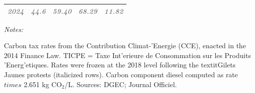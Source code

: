 \begin{table}[!h]
\begin{threeparttable}
\begin{tabular}[t]{lcccc}
\textcolor{gray}{\em{2024}} & \textcolor{gray}{\em{44.6}} & \textcolor{gray}{\em{59.40}} & \textcolor{gray}{\em{68.29}} & \textcolor{gray}{\em{11.82}}\\
\bottomrule
\end{tabular}
\begin{tablenotes}
\item \textit{Notes:} 
\item Carbon tax rates from the Contribution Climat-'{E}nergie (CCE), enacted in the 2014 Finance Law. TICPE = Taxe Int'{e}rieure de Consommation sur les Produits '{E}nerg'{e}tiques. Rates were frozen at the 2018 level following the textit{Gilets Jaunes} protests (italicized rows). Carbon component diesel computed as rate $times$ 2.651 kg CO$_2$/L. Sources: DGEC; Journal Officiel.
\end{tablenotes}
\end{threeparttable}
\end{table}
